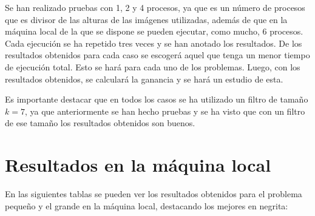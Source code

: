 \documentclass[11pt,a4paper]{article}
\begin{document}
Se han realizado pruebas con 1, 2 y 4 procesos, ya que es un número de procesos que es divisor
de las alturas de las imágenes utilizadas, además de que en la máquina local de la que se
dispone se pueden ejecutar, como mucho, 6 procesos. Cada ejecución se ha repetido tres
veces y se han anotado los resultados. De los resultados obtenidos para cada caso se escogerá
aquel que tenga un menor tiempo de ejecución total. Esto se hará para cada uno de los problemas.
Luego, con los resultados obtenidos, se calculará la ganancia y se hará un estudio de esta.

Es importante destacar que en todos los casos se ha utilizado un filtro de tamaño $k = 7$, ya
que anteriormente se han hecho pruebas y se ha visto que con un filtro de ese tamaño los
resultados obtenidos son buenos.

\section{Resultados en la máquina local}

En las siguientes tablas se pueden ver los resultados obtenidos para el problema pequeño
y el grande en la máquina local, destacando los mejores en negrita:
\end{document}
